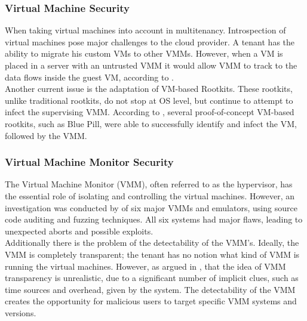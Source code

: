 {{\subsubsection{Virtual Machine Security}
When taking virtual machines into account in multitenancy. Introspection of virtual machines pose major challenges to the cloud provider. A tenant has the ability to migrate his custom VMs to other VMMs. However, when a VM is placed in a server with an untrusted VMM it would allow VMM to track to the data flows inside the guest VM, according to \cite{Takahashi2012Security}. \\
Another current issue is the adaptation of VM-based Rootkits. These rootkits, unlike traditional rootkits, do not stop at OS level, but continue to attempt to infect the supervising VMM. According to \cite{Takahashi2012Security}, several proof-of-concept VM-based rootkits, such as Blue Pill, were able to successfully identify and infect the VM, followed by the VMM.\\

\subsubsection{Virtual Machine Monitor Security}
The Virtual Machine Monitor (VMM), often referred to as the hypervisor, has the essential role of isolating and controlling the virtual machines. However, an investigation was conducted by \cite{Ormandy2007}of six major VMMs and emulators, using source code auditing and fuzzing techniques. All six systems had major flaws, leading to unexpected aborts and possible exploits.\\
Additionally there is the problem of the detectability of the VMM’s. Ideally, the VMM is completely transparent; the tenant has no notion what kind of VMM is running the virtual machines. However, as argued in \cite{Takahashi2012Security}, that the idea of VMM transparency is unrealistic, due to a significant number of implicit clues, such as time sources and overhead, given by the system. The detectability of the VMM creates the opportunity for malicious users to target specific VMM systems and versions.\\

}}
